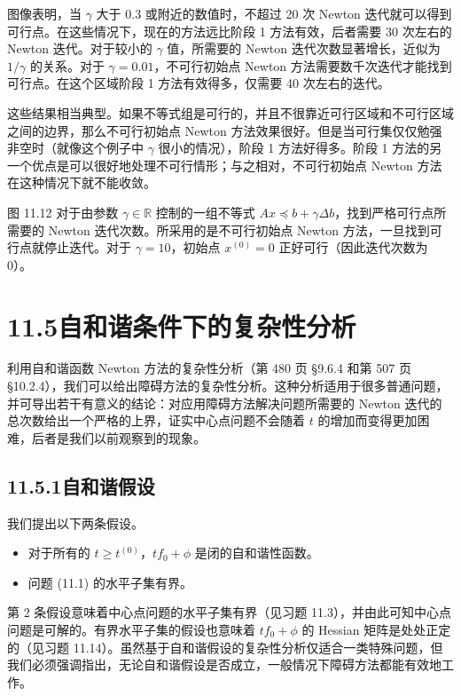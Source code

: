 \documentclass[UTF8,12pt,a4paper,fontset=fandol]{ctexart}
\begin{document}
图像表明，当 $\gamma$ 大于 $0.3$ 或附近的数值时，不超过 20 次 Newton 迭代就可以得到可行点。在这些情况下，现在的方法远比阶段 1 方法有效，后者需要 30 次左右的 Newton 迭代。对于较小的 $\gamma$ 值，所需要的 Newton 迭代次数显著增长，近似为 $1/\gamma$ 的关系。对于 $\gamma=0.01$，不可行初始点 Newton 方法需要数千次迭代才能找到可行点。在这个区域阶段 1 方法有效得多，仅需要 40 次左右的迭代。

这些结果相当典型。如果不等式组是可行的，并且不很靠近可行区域和不可行区域之间的边界，那么不可行初始点 Newton 方法效果很好。但是当可行集仅仅勉强非空时（就像这个例子中 $\gamma$ 很小的情况），阶段 1 方法好得多。阶段 1 方法的另一个优点是可以很好地处理不可行情形；与之相对，不可行初始点 Newton 方法在这种情况下就不能收敛。

图 11.12 对于由参数 $\gamma\in\mathbb{R}$ 控制的一组不等式 $Ax\preceq b+\gamma\Delta b$，找到严格可行点所需要的 Newton 迭代次数。所采用的是不可行初始点 Newton 方法，一旦找到可行点就停止迭代。对于 $\gamma=10$，初始点 $x^{(0)}=0$ 正好可行（因此迭代次数为 0）。

\section*{11.5\quad 自和谐条件下的复杂性分析}

利用自和谐函数 Newton 方法的复杂性分析（第 480 页 \S9.6.4 和第 507 页 \S10.2.4），我们可以给出障碍方法的复杂性分析。这种分析适用于很多普通问题，并可导出若干有意义的结论：对应用障碍方法解决问题所需要的 Newton 迭代的总次数给出一个严格的上界，证实中心点问题不会随着 $t$ 的增加而变得更加困难，后者是我们以前观察到的现象。

\subsection*{11.5.1\quad 自和谐假设}

我们提出以下两条假设。

\begin{itemize}
\item 对于所有的 $t\geq t^{(0)}$，$tf_0+\phi$ 是闭的自和谐性函数。
\item 问题 (11.1) 的水平子集有界。
\end{itemize}

第 2 条假设意味着中心点问题的水平子集有界（见习题 11.3），并由此可知中心点问题是可解的。有界水平子集的假设也意味着 $tf_0+\phi$ 的 Hessian 矩阵是处处正定的（见习题 11.14）。虽然基于自和谐假设的复杂性分析仅适合一类特殊问题，但我们必须强调指出，无论自和谐假设是否成立，一般情况下障碍方法都能有效地工作。
\end{document}
